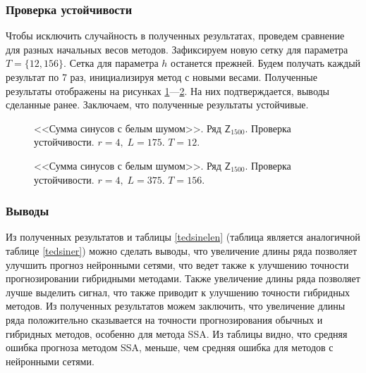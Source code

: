 \documentclass[specialist,
               substylefile = spbu.rtx,
               subf,href,colorlinks=true, 12p]{disser}
\newcommand{\multiref}[2]{\ref{#1}---\ref{#2}}
\begin{document}
\subsubsection{Проверка устойчивости}
Чтобы исключить случайность в полученных результатах, проведем сравнение для разных начальных весов методов. Зафиксируем новую сетку для параметра $T = \{12, 156\}$. Сетка для параметра $h$ останется прежней. Будем получать каждый результат по 7 раз, инициализируя метод с новыми весами. Полученные результаты отображены на рисунках \multiref{edsinelen4.12}{edsinelen4.156}. На них подтверждается, выводы сделанные ранее. Заключаем, что полученные результаты устойчивые.

\begin{figure}[h]
	\captionsetup{justification=centering}
	\caption{<<Сумма синусов с белым шумом>>. Ряд $\mathsf{Z}_{1500}$. Проверка устойчивости. $r = 4, \; L = 175$. $T = 12$.}
	\label{edsinelen4.12}
\end{figure}

\begin{figure}[h]
	\captionsetup{justification=centering}
	\caption{<<Сумма синусов с белым шумом>>. Ряд $\mathsf{Z}_{1500}$. Проверка устойчивости. $r = 4, \; L = 375$. $T = 156$.}
	\label{edsinelen4.156}
\end{figure}

\subsubsection{Выводы}
Из полученных результатов и таблицы \ref{tedsinelen} (таблица является аналогичной таблице \ref{tedsiner}) можно сделать выводы, что увеличение длины ряда позволяет улучшить прогноз нейронными сетями, что ведет также к улучшению точности прогнозировании гибридными методами. Также увеличение длины ряда позволяет лучше выделить сигнал, что также приводит к улучшению точности гибридных методов. Из полученных результатов можем заключить, что увеличение длины ряда положительно сказывается на точности прогнозирования обычных и гибридных методов, особенно для метода SSA. Из таблицы видно, что средняя ошибка прогноза методом SSA, меньше, чем средняя ошибка для методов с нейронными сетями.
\end{document}
